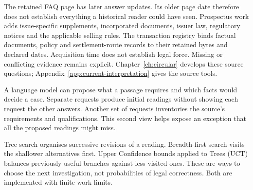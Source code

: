 The retained FAQ page has later answer updates. Its older page date therefore
does not establish everything a historical reader could have seen. Prospectus
work adds issue-specific supplements, incorporated documents, issuer law,
regulatory notices and the applicable selling rules. The transaction registry
binds factual documents, policy and settlement-route records to their retained
bytes and declared dates. Acquisition time does not establish legal force.
Missing or conflicting evidence remains explicit. Chapter~\ref{ch:circular}
develops these source questions; Appendix~\ref{app:current-interpretation} gives
the source tools.

\clearpage
{}
A language model can propose what a passage requires and which facts would
decide a case. Separate requests produce initial readings without showing each
request the other answers. Another set of requests inventories the source's
requirements and qualifications. This second view helps expose an exception
that all the proposed readings might miss.

\begin{MapDiagram}
\end{MapDiagram}

Tree search organises successive revisions of a reading. Breadth-first search
visits the shallower alternatives first. Upper Confidence bounds applied to
Trees (UCT) balances previously useful branches against less-visited ones.
These are ways to choose the next investigation, not probabilities of legal
correctness. Both are implemented with finite work limits.

